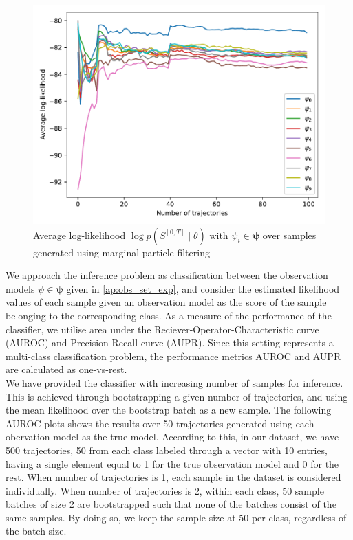 \begin{figure}[H]
	\begin{center}
		\includegraphics[width=.7\textwidth]{figures/roc_analysis/roc_particleFilter/llh_particleFilter_psi_0}
		\caption[Average log-likelihood in the case of marginal particle filtering]{Average log-likelihood $ \log p(S^{[0,T]} \mid \theta) $ with $ \psi_i \in \symbf{\psi} $ over samples generated using marginal particle filtering}
		\label{fig:llh_particle}
	\end{center}
\end{figure}
\pagebreak
We approach the inference problem as classification between the observation models $ \psi \in \symbf{\psi} $ given in \cref{ap:obs_set_exp}, and consider the estimated likelihood values of each sample given an observation model as the score of the sample belonging to the corresponding class. As a measure of the performance of the classifier, we utilise area under the Reciever-Operator-Characteristic curve (AUROC) and Precision-Recall curve (AUPR). Since this setting represents a multi-class classification problem, the performance metrics AUROC and AUPR are calculated as one-vs-rest. \\ %
We have provided the classifier with increasing number of samples for inference. This is achieved through bootstrapping a given number of trajectories, and using the mean likelihood over the bootstrap batch as a new sample. The following AUROC plots shows the results over 50 trajectories generated using each obervation model as the true model. According to this, in our dataset, we have 500 trajectories, 50 from each class labeled through a vector with 10 entries, having a single element equal to 1 for the true observation model and 0 for the rest. When number of trajectories is 1, each sample in the dataset is considered individually. When number of trajectories is 2, within each class, 50 sample batches of size 2 are bootstrapped such that none of the batches consist of the same samples. By doing so, we keep the sample size at 50 per class, regardless of the batch size. \\
